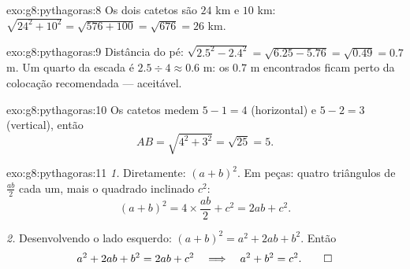 \begin{solution}{exo:g8:pythagoras:8}
Os dois catetos são $24$ km e $10$ km:
$\sqrt{24^2 + 10^2} = \sqrt{576 + 100} = \sqrt{676} = 26$ km.
\end{solution}

\begin{solution}{exo:g8:pythagoras:9}
Distância do pé: $\sqrt{2.5^2 - 2.4^2} = \sqrt{6.25 - 5.76} =
\sqrt{0.49} = 0.7$ m. Um quarto da escada é
$2.5 \div 4 \approx 0.6$ m: os $0.7$ m encontrados ficam perto da
colocação recomendada --- aceitável.
\end{solution}

\begin{solution}{exo:g8:pythagoras:10}
Os catetos medem $5 - 1 = 4$ (horizontal) e $5 - 2 = 3$ (vertical),
então
\[
AB = \sqrt{4^2 + 3^2} = \sqrt{25} = 5 .
\]
\end{solution}

\begin{solution}{exo:g8:pythagoras:11}
\emph{1.} Diretamente: $(a + b)^2$. Em peças: quatro triângulos de
 $\frac{ab}{2}$ cada um, mais o quadrado inclinado $c^2$:
\[
(a + b)^2 = 4 \times \frac{ab}{2} + c^2 = 2ab + c^2 .
\]

\emph{2.} Desenvolvendo o lado esquerdo: $(a+b)^2 = a^2 + 2ab + b^2$.
Então
\[
a^2 + 2ab + b^2 = 2ab + c^2
\quad\Longrightarrow\quad
a^2 + b^2 = c^2 . \qed
\]
\end{solution}


